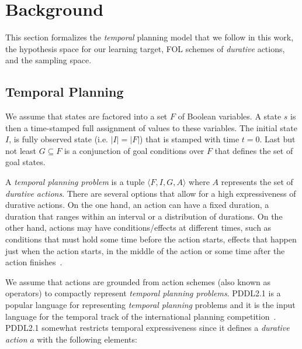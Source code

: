 \documentclass{ecai}
\newcommand{\tup}[1]{{\langle #1 \rangle}}
\begin{document}
\section{Background}
This section formalizes the {\em temporal} planning model that we follow in this work, the hypothesis space for our learning target, FOL schemes of {\em durative} actions, and the sampling space.

\subsection{Temporal Planning}
\label{sec:temporalplanning}

We assume that states are factored into a set $F$ of Boolean variables. A state $s$ is then a time-stamped full assignment of values to these variables. The initial state $I$, is fully observed state (i.e. $|I|=|F|$) that is stamped with time $t=0$. Last but not least $G \subseteq F$ is a conjunction of goal conditions over $F$ that defines the set of goal states.

A {\em temporal planning problem} is a tuple $\tup{F,I,G,A}$ where $A$ represents the set of {\em durative actions}. There are several options that allow for a high expressiveness of durative actions. On the one hand, an action can have a fixed duration, a duration that ranges within an interval or a distribution of durations. On the other hand, actions may have conditions/effects at different times, such as conditions that must hold some time before the action starts, effects that happen just when the action starts, in the middle of the action or some time after the action finishes~\cite{garrido2009constraint}.

We assume that actions are grounded from action schemes (also known as operators) to compactly represent {\em temporal planning problems}.  PDDL2.1 is a popular language for representing {\em temporal planning} problems and it is the input language for the temporal track of the international planning competition~\cite{fox2003pddl2,ghallab2004automated}. PDDL2.1 somewhat restricts temporal expressiveness since it defines a {\em durative action} $a$ with the following elements:
\end{document}
